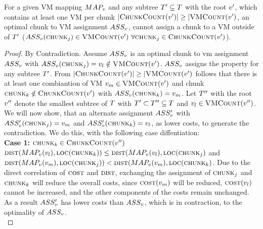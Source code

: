 \begin{lemma}
\label{lemma:matching1}
For a given VM mapping $MAP_v$ and any subtree $T' \subseteq 
T$ with the root $v'$, which contains at least one VM per 
chunk $|\textsc{ChunkCount}(v')| \geq |\textsc{VMCount}(v')$, an 
optimal chunk to VM assignment $ASS_v$, cannot assign a chunk 
to a VM outside of $T'$ ($ASS_v(\textsc{chunk}_j) \in 
\textsc{VMCount}(v')~ \forall \textsc{chunk}_j \in \textsc{ChunkCount}(v')$).
\end{lemma}

\begin{proof}
 By Contradiction. Assume $ASS_v$ is an optimal chunk to vm 
assignment $ASS_v$ with $ASS_v(\textsc{chunk}_j) 
=v_l \notin \textsc{VMCount}(v')$. $ASS_v$ assigns 
the property for any subtree $T'$. From $|\textsc{ChunkCount}(v')| 
\geq 
|\textsc{VMCount}(v')$ follows that there is at least one combiantion of 
VM 
$v_m \in \textsc{VMCount}(v')$ and chunk $\textsc{chunk}_k \notin 
\textsc{ChunkCount}(v')$ with $ASS_v(\textsc{chunk}_k) = 
v_m$. Let $T''$ with the root $v''$ denote the 
smallest subtree of $T$ with $T' \subset T'' \subseteq T$ and 
$v_l \in \textsc{VMCount}(v'')$. We will now show, that an 
alternate assignment $ASS_v'$ with 
$ASS_v'(\textsc{chunk}_j) = v_m$ and 
$ASS_v'(\textsc{chunk}_k) = v_l$, as lower costs, to generate 
the contradiction. We do this, with the following case diffentiation: 
\\
\textbf{Case 1:} $\textsc{chunk}_k \in \textsc{ChunkCount}(v'')$\\
$\textsc{dist}(MAP_v(v_l), \textsc{loc}(\textsc{chunk}_k)) \leq 
\textsc{dist}(MAP_v(v_l), \textsc{loc}(\textsc{chunk}_j)$ and 
$\textsc{dist}(MAP_v(v_m), \textsc{loc}(\textsc{chunk}_j)) < 
\textsc{dist}(MAP_v(v_m), \textsc{loc}(\textsc{chunk}_k)$. Due to the 
direct correlation of $\textsc{cost}$ and $\textsc{dist}$, exchanging the 
assignment of $\textsc{chunk}_j$ and $\textsc{chunk}_k$ will reduce the overall costs, since 
$\textsc{cost}(v_m)$ will be reduced, 
$\textsc{cost}(v_l)$ cannot be increased, and the other components 
of the costs remain unchanged. As a result $ASS_v'$ has lower 
costs than $ASS_v$, which is in contraction, to the optimality of
$ASS_v$.\\

\end{proof}
